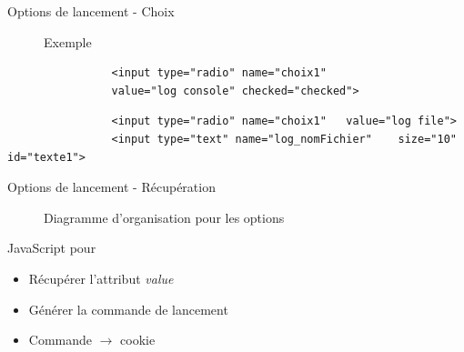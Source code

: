 \documentclass{beamer}
\begin{document}
\begin{frame}[fragile]{\textcolor{bleu2}{\hspace{1cm}Options de lancement - Choix}}
	\begin{figure}
		\begin{center}
			\caption{Exemple}
		\end{center}
	\end{figure}
	\scriptsize
	\begin{center}
		\begin{minipage}[c]{0.9\textwidth}
			\begin{verbatim}
				<input type="radio" name="choix1" 						
				value="log console" checked="checked">
			\end{verbatim}
			\begin{verbatim}
				<input type="radio" name="choix1" 	value="log file">
				<input type="text" name="log_nomFichier" 	size="10" id="texte1">
			\end{verbatim}
		\end{minipage}
	\end{center}
\end{frame}

\begin{frame}{\textcolor{bleu2}{\hspace{1cm}Options de lancement - Récupération}}
	\begin{figure}
		\begin{center}
			\caption{Diagramme d'organisation pour les options}
		\end{center}
	\end{figure}
	\begin{block}{\hspace{0.2cm}JavaScript pour}
		\begin{itemize}
			\item Récupérer l'attribut \textit{value} 
			\item Générer la commande de lancement 
			\item Commande $\rightarrow$ cookie
		\end{itemize}
	\end{block}
\end{frame}
\end{document}
